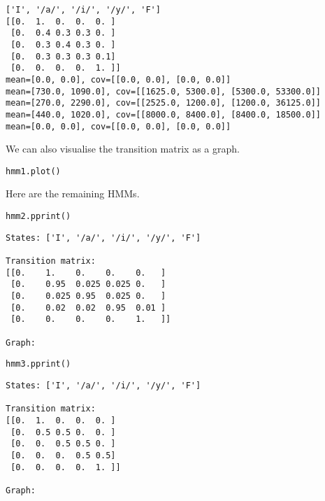 \documentclass[11pt]{article}
\begin{document}
\begin{verbatim}
['I', '/a/', '/i/', '/y/', 'F']
[[0.  1.  0.  0.  0. ]
 [0.  0.4 0.3 0.3 0. ]
 [0.  0.3 0.4 0.3 0. ]
 [0.  0.3 0.3 0.3 0.1]
 [0.  0.  0.  0.  1. ]]
mean=[0.0, 0.0], cov=[[0.0, 0.0], [0.0, 0.0]]
mean=[730.0, 1090.0], cov=[[1625.0, 5300.0], [5300.0, 53300.0]]
mean=[270.0, 2290.0], cov=[[2525.0, 1200.0], [1200.0, 36125.0]]
mean=[440.0, 1020.0], cov=[[8000.0, 8400.0], [8400.0, 18500.0]]
mean=[0.0, 0.0], cov=[[0.0, 0.0], [0.0, 0.0]]
\end{verbatim}

We can also visualise the transition matrix as a graph.

\begin{verbatim}
hmm1.plot()
\end{verbatim}

\begin{center}

\end{center}

Here are the remaining HMMs.

\begin{verbatim}
hmm2.pprint()
\end{verbatim}

\begin{verbatim}
States: ['I', '/a/', '/i/', '/y/', 'F']

Transition matrix:
[[0.    1.    0.    0.    0.   ]
 [0.    0.95  0.025 0.025 0.   ]
 [0.    0.025 0.95  0.025 0.   ]
 [0.    0.02  0.02  0.95  0.01 ]
 [0.    0.    0.    0.    1.   ]]

Graph:
\end{verbatim}

\begin{center}

\end{center}

\begin{verbatim}
hmm3.pprint()
\end{verbatim}

\begin{verbatim}
States: ['I', '/a/', '/i/', '/y/', 'F']

Transition matrix:
[[0.  1.  0.  0.  0. ]
 [0.  0.5 0.5 0.  0. ]
 [0.  0.  0.5 0.5 0. ]
 [0.  0.  0.  0.5 0.5]
 [0.  0.  0.  0.  1. ]]

Graph:
\end{verbatim}
\end{document}
